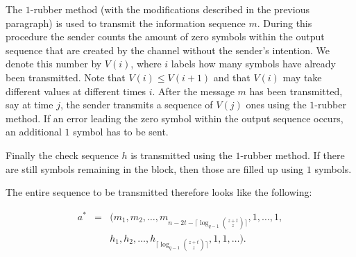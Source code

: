 \documentclass[conference]{IEEEtran}
\begin{document}
The $1$-rubber method (with the modifications described in the previous paragraph) is used to transmit the information sequence $m$. During this procedure the sender counts the amount of zero symbols within the output sequence that are created by the channel without the sender's intention. We denote this number by $V(i)$, where $i$ labels how many symbols have already been transmitted.
Note that $V(i)\leq V(i+1)$ and that $V(i)$ may take different values at different times $i$.
After the message $m$ has been transmitted, say at time $j$, the sender transmits a sequence of $V(j)$ ones using the $1$-rubber method. If an error leading the zero symbol within the output sequence occurs, an additional $1$ symbol has to be sent.

Finally the check sequence $h$ is transmitted using the $1$-rubber method. If there are still symbols remaining in the block, then those are filled up using $1$ symbols.

The entire sequence to be transmitted therefore looks like the following:

\begin{eqnarray*}
a^{\ast}&=&(m_1,m_2,\ldots ,m_{n-2t-\lceil \log_{q-1}\binom{z+t}{z}
\rceil},1,\ldots,1,\\
&&h_1,h_2,\ldots ,h_{\lceil
\log_{q-1}\binom{z+t}{z} \rceil},1,1,\ldots).
\end{eqnarray*}
\end{document}
